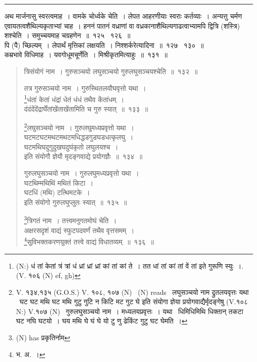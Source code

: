 \documentclass[11pt, openany]{book}
\begin{document}
\hrule

\vspace{2mm}
अथ मार्जनासु स्वरत्वमाह~। वामके चोर्ध्वके चेति~। लेपत आहरणीयाः स्वराः कर्तव्याः~। अन्यत्तु चर्मण एवायतत्वशैथिल्यकृताभ्यां चाह~। हननं पातनं वध्राणां वा वध्रकानाशैथिल्यगाढत्वाभ्यामपि द्वित्रि (शस्त्रि) शश्चेति~। समुच्चयमाह चग्रहणेन~॥~१२५ \textendash\ १२६~॥\\

पि (पै) च्छिल्यम्~। लेपार्थं मृत्तिकां लक्षयति~। {\qtt निश्शर्करेत्यादिना}~॥~१२७ \textendash\ १३०~॥\\

कम्रभावे विधिमाह~। {\qtt यवगोधूमचूर्णेति}~। मिश्रीकृतमित्याहुः~॥~१३१~॥

\newpage

\begin{quote}
{\na त्रिसंयोगं नाम~। गुरुसञ्चयो लघुसञ्चयो गुरुलघुसञ्चयश्चेति~॥~१३२~॥

तत्र गुरुसञ्चयो नाम~। गुरुस्थितलयौघवृत्तो यथा~।\\
\renewcommand{\thefootnote}{1}\footnote{(N:) धं तां केतां त्रं त्रां धं ध्रां ध्रां ध्रां कां तां कां ते~। तत धां तां कां तां वें तां इते गुरूणि स्युः~।. (V. १०६ (N) ef, gh)}धंतां केतां धंद्रां धेतं धंधं तथैव केंतांधम्~।\\
दंदंदेंदेंद्रार्घेंतांखेंताखेंतामिति च गुरु स्यात्~॥~१३३~॥

\renewcommand{\thefootnote}{2}\footnote{V. १३४,१३५ (G.O.S.) V. १०८, १०७ (N)  \textendash\  (N) reads  \textendash\  लघुसञ्चयो नाम द्रुतलयवृत्तः यथा \textendash\ घट घट मथि घट मथि गुटु गुटि न किटि मट गुट घे इति संयोगा ज्ञेया प्रयोगवाद्यैर्मृदङ्गेषु (V.१०८ N:) V.१०७ (N)  \textendash\  गुरुलघुसञ्चयो नाम~। मध्यलयप्रवृत्तः~। यथा \textendash\ धिमिधिमिथि धिक्तान् तकटा घट नघि घटयो~। घय मथि घे घं घे यो टु णु ढेकिंट गुटु घट घेमति~।}लघुसञ्चयो नाम~। गुरुलघुमध्यप्रवृत्तो यथा~।\\

घटमटघटमथटमथटमधिद्धडगुडघडधत्कृलघु~।\\
घटमथिघदुगुदुखघदुघंकृतो लघुलयश्च~।\\
इति संयोगौ ज्ञेयौ मृदङ्गवाद्ये प्रयोगज्ञैः~॥~१३४~॥

गुरुलघुसञ्चयो नाम~। गुरुलघुमध्यप्रवृत्तो यथा~।\\
घटथिम्मथिथिं मथितं किटा~।\\
घटधिं (मथि) टत्थिमटके~।\\
इति संयोगो गुरुलघुप्लुतः स्यात्~॥~१३५~॥

\renewcommand{\thefootnote}{3}\footnote{(N) has प्रकृतिर्नाम}त्रिगतं नाम~। तत्त्वमनुगतमोघं चेति~।\\
अक्षरसदृशं वाद्यं स्फुटपदवर्णं तथैव वृत्तसमम्~।\\
\renewcommand{\thefootnote}{4}\footnote{भ. अ.~।}सुविभक्तकरणयुक्तं तत्त्वे वाद्यं विधातव्यम्~॥~१३६~॥}
\end{quote}
\end{document}
